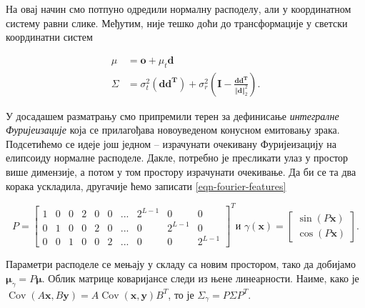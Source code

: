 \documentclass[12pt, a4paper, twoside]{book}
\numberwithin{equation}{chapter}
\numberwithin{theorem}{section}
\numberwithin{definition}{section}
\numberwithin{definitionChapter}{chapter}
\begin{document}
На овај начин смо потпуно одредили нормалну расподелу, али у координатном систему равни слике. Међутим,
није тешко доћи до трансформације у светски координатни систем

\begin{equation}
	\begin{split}
		\mu & = \mathbf{o} + \mu_t\mathbf{d} \\
		\Sigma & = \sigma_t^2\left(\mathbf{d}\mathbf{d^T}\right) +
			\sigma_r^2\left(\mathbf{I} - \frac{\mathbf{d}\mathbf{d^T}}{\Vert \mathbf{d}\Vert_2^2}\right).
	\end{split}
\end{equation}

У досадашем разматрању смо припремили терен за дефинисање \textit{интегралне Фуријеизације} која се
прилагођава новоуведеном конусном емитовању зрака. Подсетићемо се идеје још једном -- израчунати очекивану
Фуријеизацију на елипсоиду нормалне расподеле. Дакле, потребно је пресликати улаз у простор више димензије,
а потом у том простору израчунати очекивање. Да би се та два корака ускладила, другачије ћемо записати
\ref{eqn-fourier-features}

\begin{equation}
		P =
		\begin{bmatrix}
			1 & 0 & 0 & 2 & 0 & 0 & ... & 2^{L-1} & 0 & 0 \\
			0 & 1 & 0 & 0 & 2 & 0 & ... & 0 & 2^{L-1} & 0 \\
			0 & 0 & 1 & 0 & 0 & 2 & ... & 0 & 0 & 2^{L-1}
		\end{bmatrix}^T \text{и }
		\gamma(\mathbf{x}) =
		\begin{bmatrix}
			\sin(P\mathbf{x}) \\
			\cos(P\mathbf{x})
		\end{bmatrix}.
\end{equation}

Параметри расподеле се мењају у складу са новим простором, тако да добијамо
$\boldsymbol{\mu}_\gamma = P\boldsymbol{\mu}$. Облик матрице коваријансе следи из њене линеарности.
Наиме, како је $\operatorname{Cov}(A\mathbf{x}, B\mathbf{y}) = A\operatorname{Cov}(\mathbf{x}, \mathbf{y})B^T$,
то је $\Sigma_\gamma = P\Sigma P^T$.
\end{document}
